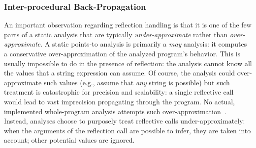 \subsubsection{Inter-procedural Back-Propagation}
\label{reflection/sec:back-propagation}

An important observation regarding reflection handling is that it is
one of the few parts of a static analysis that are typically
\emph{under-approximate} rather than \emph{over-approximate}.  A
static points-to analysis is primarily a \emph{may} analysis: it
computes a conservative over-approximation of the analyzed program's
behavior. This is usually impossible to do in the presence of
reflection: the analysis cannot know all the values that a string
expression can assume. Of course, the analysis could over-approximate
such values (e.g., assume that \emph{any} string is possible) but such
treatment is catastrophic for precision and scalability: a single
reflective call would lead to vast imprecision propagating through the
program. No actual, implemented whole-program analysis attempts such
over-approximation~\cite{soundiness15}. Instead, analyses choose to
purposely treat reflective calls under-approximately: when the
arguments of the reflection call are possible to infer, they are taken
into account; other potential values are ignored.

